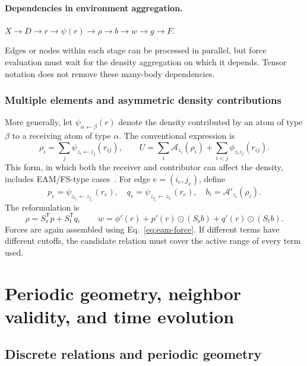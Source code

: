 \documentclass[11pt,a4paper]{article}
\newcommand{\src}{S_{\mathrm s}}
\newcommand{\dst}{S_{\mathrm t}}
\theoremstyle{definition}
\begin{document}
\paragraph{Dependencies in environment aggregation.}
$X\to D\to r\to\psi(r)\to\rho\to b\to w\to g\to F$.

Edges or nodes within each stage can be processed in parallel, but force evaluation must wait
for the density aggregation on which it depends. Tensor notation does not remove these many-body
dependencies.



\subsubsection{Multiple elements and asymmetric density contributions}
More generally, let $\psi_{\alpha\leftarrow\beta}(r)$ denote the density contributed by an atom
of type $\beta$ to a receiving atom of type $\alpha$. The conventional expression is
\begin{equation}
\rho_i=\sum_j\psi_{z_i\leftarrow z_j}(r_{ij}),\qquad
U=\sum_i\mathcal A_{z_i}(\rho_i)+\sum_{i<j}\phi_{z_i z_j}(r_{ij}).
\end{equation}
This form, in which both the receiver and contributor can affect the density, includes
EAM/FS-type cases~\cite{lammps-eam}. For edge $e=(i_e,j_e)$, define
\begin{equation}
p_e=\psi_{z_{i_e}\leftarrow z_{j_e}}(r_e),\quad
q_e=\psi_{z_{j_e}\leftarrow z_{i_e}}(r_e),\quad
b_i=\mathcal A'_{z_i}(\rho_i).
\end{equation}
The reformulation is
\begin{equation}
\rho=\src^{\mathsf T}p+\dst^{\mathsf T}q,\qquad
w=\phi'(r)+p'(r)\odot(\src b)+q'(r)\odot(\dst b).
\label{eq:eam-multi}
\end{equation}
Forces are again assembled using Eq.~\eqref{eq:eam-force}. If different terms have different
cutoffs, the candidate relation must cover the active range of every term used.
\section{Periodic geometry, neighbor validity, and time evolution}
\subsection{Discrete relations and periodic geometry}
\label{sec:pbc}
\end{document}
